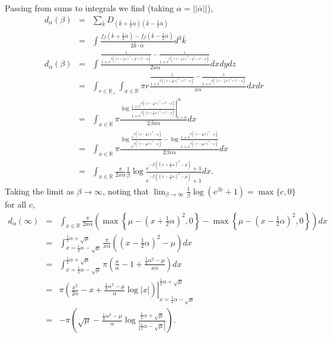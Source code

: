 \documentclass{article}
\newcommand{\beas}{\begin{eqnarray*}}
\newcommand{\enas}{\end{eqnarray*}}
\newcommand{\half}{{\frac{1}{2}}} \newcommand{\quarter}{{\frac{1}{4}}}
\newcommand{\reals}{\mathbb{R}}
\begin{document}
Passing from sums to integrals we find (taking $\alpha = ||\bar{\alpha}||$),
\beas
d_{\alpha}(\beta) &=&
\sum_{\bar{k}} D_{(\bar{k}+\half\bar{\alpha})(\bar{k}-\half\bar{\alpha})}\\
&=&
\int \frac{
f_\beta(\bar{k}+\half \bar{\alpha}) - f_\beta(\bar{k}-\half \bar{\alpha})
}{
 2 \bar{k} \cdot \bar{\alpha}
}
d^3\bar{k}\\
d_{\alpha}(\beta) &=&
\int \frac{
\frac{1}{1+e^{\beta( (x+\half\alpha)^2 + y^2 + z^2 - \mu)}}
- \frac{1}{1+e^{\beta( (x-\half\alpha)^2 + y^2 + z^2 - \mu)}}
}{
 2 x \alpha
}
dx dy dz\\
&=&
\int_{r \in \reals_+} \int_{x\in \reals}
\pi r \frac{
\frac{1}{1+e^{\beta( (x+\half\alpha)^2 + r^2 - \mu)}}
- \frac{1}{1+e^{\beta( (x-\half\alpha)^2 + r^2 - \mu)}}
}{
 x \alpha
}
dx dr\\
&=&
\int_{x\in \reals}
\pi \frac{
\left.
\log
\frac{1+e^{\beta( (x-\half\alpha)^2 + r^2 - \mu)}}
     {1+e^{\beta( (x+\half\alpha)^2 + r^2 - \mu)}}
\right|_{r=0}^\infty
}{
 2 \beta x \alpha
}
dx\\
&=&
\int_{x\in \reals}
\pi \frac{
\log
\frac{e^{\beta( (x-\half\alpha)^2 - \mu)}}
     {e^{\beta( (x+\half\alpha)^2 - \mu)}}
-
\log
\frac{1+e^{\beta( (x-\half\alpha)^2 - \mu)}}
     {1+e^{\beta( (x+\half\alpha)^2 - \mu)}}
}{
 2 \beta x \alpha
}
dx\\
&=&
\int_{x\in \reals}
\frac{\pi}{2x\alpha} \frac{1}{\beta}
\log
\frac{e^{-\beta( (x+\half\alpha)^2 - \mu)}+1}
     {e^{-\beta( (x-\half\alpha)^2 - \mu)}+1}
dx.
\enas
Taking the limit as $\beta \rightarrow \infty$, noting that
$\lim_{\beta \rightarrow \infty} \frac{1}{\beta} \log(e^{\beta c}+1)
=\max\{c,0\}$ for all $c$,
\beas
d_{\alpha}(\infty)
 &=&
\int_{x\in \reals}
\frac{\pi}{2 x \alpha}
\left(\max\left\{\mu - (x+\half\alpha)^2,0\right\}
-\max\left\{\mu - (x-\half\alpha)^2,0\right\}\right)
dx\\
 &=&
 \int_{x=\half \alpha - \sqrt{\mu}}^{\half \alpha + \sqrt{\mu}}
\frac{\pi}{x \alpha}
\left((x-\half\alpha)^2-\mu\right)
dx\\
 &=&
\int_{x=\half \alpha - \sqrt{\mu}}^{\half \alpha + \sqrt{\mu}}
\pi
\left(\frac{x}{\alpha} -1 + \frac{\frac{1}{4} \alpha^2-\mu}{x \alpha}\right)
dx\\
 &=&
\left.
\pi
\left(\frac{x^2}{2\alpha}-x + \frac{\frac{1}{4} \alpha^2-\mu}{\alpha}\log|x|\right)
\right|_{x=\half \alpha - \sqrt{\mu}}^{\half \alpha + \sqrt{\mu}}\\
 &=&
-\pi
\left(\sqrt{\mu} - \frac{\frac{1}{4} \alpha^2-\mu}{\alpha}
\log\frac{\half \alpha + \sqrt{\mu}}{\left|\half \alpha - \sqrt{\mu}\right|}
\right).
\enas
\end{document}
